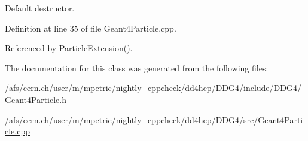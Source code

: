 Default destructor. 



Definition at line 35 of file Geant4\+Particle.\+cpp.



Referenced by Particle\+Extension().



The documentation for this class was generated from the following files\+:\begin{DoxyCompactItemize}
\item 
/afs/cern.\+ch/user/m/mpetric/nightly\+\_\+cppcheck/dd4hep/\+D\+D\+G4/include/\+D\+D\+G4/\hyperlink{_geant4_particle_8h}{Geant4\+Particle.\+h}\item 
/afs/cern.\+ch/user/m/mpetric/nightly\+\_\+cppcheck/dd4hep/\+D\+D\+G4/src/\hyperlink{_geant4_particle_8cpp}{Geant4\+Particle.\+cpp}\end{DoxyCompactItemize}
